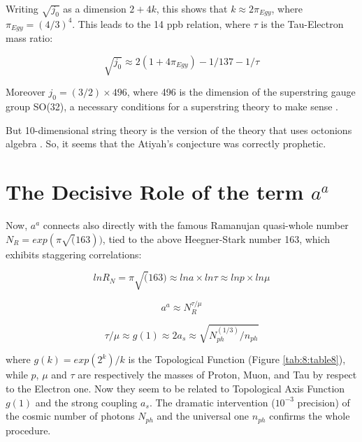 \documentclass[a4paper,9pt]{article}
\begin{document}
Writing $\sqrt{j_0}$ as a dimension $2+4k$, this shows that $k \approx 2 \pi_{Egy}$, where $\pi_{Egy} = (4/3)^4$. This leads to the 14 ppb relation, where $\tau$ is the Tau-Electron mass ratio: 

\begin{equation}
 \sqrt{j_0} \approx 2 (1+4\pi_{Egy}) - 1/137 -1/\tau
\end{equation}
 

Moreover $j_0 = (3/2) \times 496$, where 496 is the dimension of the superstring gauge group SO(32), a necessary conditions for a superstring theory to make sense \cite{Green}.


But 10-dimensional string theory is the version of the theory that uses octonions algebra \cite{Schlay}. So, it seems that the Atiyah's conjecture was correctly prophetic.








\section{The Decisive Role of the term $a^a$ }





Now, $a^a$ connects also directly with the famous Ramanujan quasi-whole number $N_R = exp(\pi \sqrt(163))$, tied to the above Heegner-Stark number 163, which exhibits staggering correlations:



\begin{equation}
lnR_N = \pi \sqrt(163)  \approx lna \times ln\tau  \approx  lnp \times ln\mu
\end{equation}

\begin{equation}
a^a \approx N_R^{\tau/\mu} 
\end{equation}

\begin{equation}
\tau/\mu   \approx g(1) \approx  2a_s \approx \sqrt {N_{ph}^(1/3)/n_{ph}}
\end{equation}

where $g(k) = exp(2^k)/k$ is the Topological Function (Figure \ref{tab:8:table8}), while $p$, $\mu$ and $\tau$ are respectively the masses of Proton, Muon, and Tau by respect to the Electron one.  Now they seem to be related to Topological Axis Function $g(1)$ and the strong coupling $a_s$. The dramatic intervention ($10^{-3}$ precision) of the cosmic number of photons $N_{ph}$ and the universal one $n_{ph}$ confirms the whole procedure.
\end{document}
